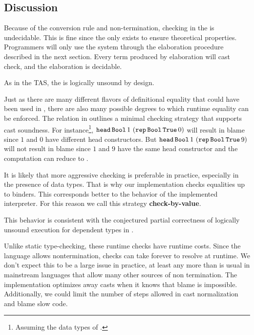  
\subsection{Discussion}
 
 
 
Because of the conversion rule and non-termination, checking in the \csys{} is undecidable.
This is fine since the \csys{} only exists to ensure theoretical properties. 
Programmers will only use the system through the elaboration procedure described in the next section.
Every term produced by elaboration will cast check, and the elaboration is decidable. %
 
As in the \slang{} \ac{TAS}, the \clang{} is logically unsound by design.
 
Just as there are many different flavors of definitional equality that could have been used in , there are also many possible degrees to which runtime equality can be enforced.
The \Blame{} relation in  outlines a minimal checking strategy that supports cast soundness.
For instance\footnote{
  Assuming the data types of .
}, $\mathtt{head}\,\mathtt{Bool}{}\,1\,\left(\mathtt{rep}\,\mathtt{Bool}{}\,\mathtt{True}{}\,0\right)$ will result in blame since $1$ and $0$ have different head constructors.
But $\mathtt{head}\,\mathtt{Bool}{}\,1\,\left(\mathtt{rep}\,\mathtt{Bool}{}\,\mathtt{True}{}\,9\right)$ will not result in blame since $1$ and $9$ have the same head constructor and the computation can reduce to \True{}.
 
It is likely that more aggressive checking is preferable in practice, especially in the presence of data types.
That is why our implementation checks equalities up to binders. 
This corresponds better to the \cbv{} behavior of the implemented interpreter.
For this reason we call this strategy \textbf{check-by-value}.
 
This behavior is consistent with the conjectured partial correctness of logically unsound \cbv{} execution for dependent types in \cite{jia2010dependent}.
 
 
Unlike static type-checking, these runtime checks have runtime costs.
Since the language allows nontermination, checks can take forever to resolve at runtime.
We don't expect this to be a large issue in practice, at least any more than is usual in mainstream languages that allow many other sources of non termination.
The implementation optimizes away casts when it knows that blame is impossible.
Additionally, we could limit the number of steps allowed in cast normalization and blame slow code.